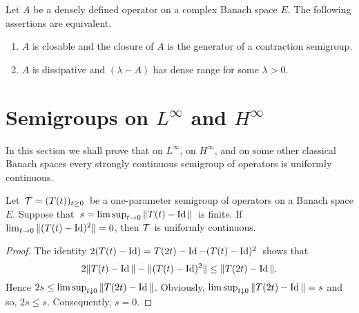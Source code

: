\begin{theorem}\label{thm:a2-2.13}
Let $A$ be a densely defined operator on a complex Banach space $E$.
The following assertions are equivalent.
\begin{enumerate}[\upshape (a)]	
\item \label{thm:a2-2.13.1}
$A$ is closable and the closure of $A$ is the generator of a contraction semigroup.
\item \label{thm:a2-2.13.2}
$A$ is dissipative and $(\lambda - A)$ has dense range for some $\lambda > 0$.
\end{enumerate}
\end{theorem}
\section{Semigroups on \texorpdfstring{$L^{\infty}$}{L-infty}  and \texorpdfstring{$H^{\infty}$}{H-infty} \label{sec:a2-3}}%
\hspace{1cm}{\Large by Heinrich P. Lotz}
\vspace{.5cm}
\newline
In this section we shall prove that on $L^\infty$, on $H^\infty$, and on some other classical Banach spaces every strongly continuous semigroup of operators is uniformly continuous.
\begin{lemma}\label{lem:a2-3.1}
Let\, $\mathcal{T} = (T(t))_{t\geq 0}$\, be a one-parameter semigroup of operators on a Banach space $E$.
Suppose that\, $s = \lim\sup_{t\to 0} \|T(t) - \operatorname{Id}\|$\, is finite.
If  $\lim_{t\to 0} \|(T(t) - \operatorname{Id})^2\| = 0$, then $\mathcal{T}$ is uniformly continuous.
\end{lemma}
\begin{proof}
The identity  $2(T(t) - \operatorname{Id}) = T(2t) - \operatorname{Id} - (T(t) - \operatorname{Id})^2$\, shows that
\[
	2\|T(t) - \operatorname{Id}\| - \|(T(t) - \operatorname{Id})^{2} \| \leq \|T(2t) - \operatorname{Id}\| .
\]
Hence $2s \leq \lim \sup_{t \downarrow 0} \|T(2t) - \operatorname{Id}\|$.
Obviously, $\lim \sup_{t \downarrow 0} \|T(2t) - \operatorname{Id}\| = s$ and so, $2s \leq s$.
Consequently, $s = 0$.
\end{proof}
